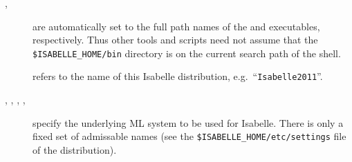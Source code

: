 \begin{isabellebody}
\begin{isamarkuptext}
\begin{description}
  \item[\hypertarget{setting.ISABELLE-PROCESS}{\hyperlink{setting.ISABELLE-PROCESS}{\mbox{}}}, \hyperlink{setting.ISABELLE-TOOL}{\mbox{}}] are automatically set to the full path
  names of the \hyperlink{executable.isabelle-process}{\mbox{}} and \hyperlink{executable.isabelle}{\mbox{}} executables, respectively.  Thus other tools and scripts
  need not assume that the \verb|$ISABELLE_HOME/bin| directory is
  on the current search path of the shell.
  
  \item[\hypertarget{setting.ISABELLE-IDENTIFIER}{\hyperlink{setting.ISABELLE-IDENTIFIER}{\mbox{}}}] refers
  to the name of this Isabelle distribution, e.g.\ ``\verb|Isabelle2011|''.

  \item[\hypertarget{setting.ML-SYSTEM}{\hyperlink{setting.ML-SYSTEM}{\mbox{}}}, \hypertarget{setting.ML-HOME}{\hyperlink{setting.ML-HOME}{\mbox{}}},
  \hypertarget{setting.ML-OPTIONS}{\hyperlink{setting.ML-OPTIONS}{\mbox{}}}, \hypertarget{setting.ML-PLATFORM}{\hyperlink{setting.ML-PLATFORM}{\mbox{}}}, \hypertarget{setting.ML-IDENTIFIER}{\hyperlink{setting.ML-IDENTIFIER}{\mbox{}}}] specify the underlying ML system
  to be used for Isabelle.  There is only a fixed set of admissable
  \hyperlink{setting.ML-SYSTEM}{\mbox{}} names (see the \verb|$ISABELLE_HOME/etc/settings| file of the distribution).
  

\end{description}
\end{isamarkuptext}
\end{isabellebody}
